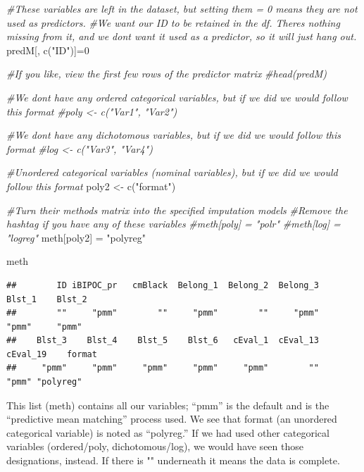 \documentclass[
  english,
]{book}
\newenvironment{Shaded}{\begin{snugshade}}{\end{snugshade}}
\newcommand{\CommentTok}[1]{\textcolor[rgb]{0.56,0.35,0.01}{\textit{#1}}}
\newcommand{\DecValTok}[1]{\textcolor[rgb]{0.00,0.00,0.81}{#1}}
\newcommand{\FunctionTok}[1]{\textcolor[rgb]{0.00,0.00,0.00}{#1}}
\newcommand{\NormalTok}[1]{#1}
\newcommand{\OtherTok}[1]{\textcolor[rgb]{0.56,0.35,0.01}{#1}}
\newcommand{\StringTok}[1]{\textcolor[rgb]{0.31,0.60,0.02}{#1}}
\begin{document}
\begin{Shaded}
\begin{Highlighting}[]
\CommentTok{\#These variables are left in the dataset, but setting them = 0 means they are not used as predictors.  }
\CommentTok{\#We want our ID to be retained in the df.  There\textquotesingle{}s nothing missing from it, and we don\textquotesingle{}t want it used as a predictor, so it will just hang out.}
\NormalTok{predM[, }\FunctionTok{c}\NormalTok{(}\StringTok{"ID"}\NormalTok{)]}\OtherTok{=}\DecValTok{0}

\CommentTok{\#If you like, view the first few rows of the predictor matrix}
\CommentTok{\#head(predM)}

\CommentTok{\#We don\textquotesingle{}t have any ordered categorical variables, but if we did we would follow this format}
\CommentTok{\#poly \textless{}{-} c("Var1", "Var2")}

\CommentTok{\#We don\textquotesingle{}t have any dichotomous variables, but if we did we would follow this format}
\CommentTok{\#log \textless{}{-} c("Var3", "Var4")}

\CommentTok{\#Unordered categorical variables (nominal variables), but if we did we would follow this format}
\NormalTok{poly2 }\OtherTok{\textless{}{-}} \FunctionTok{c}\NormalTok{(}\StringTok{"format"}\NormalTok{)}

\CommentTok{\#Turn their methods matrix into the specified imputation models}
\CommentTok{\#Remove the hashtag if you have any of these variables}
\CommentTok{\#meth[poly] = "polr" }
\CommentTok{\#meth[log] = "logreg"}
\NormalTok{meth[poly2] }\OtherTok{=} \StringTok{"polyreg"}

\NormalTok{meth}
\end{Highlighting}
\end{Shaded}

\begin{verbatim}
##        ID iBIPOC_pr   cmBlack  Belong_1  Belong_2  Belong_3    Blst_1    Blst_2 
##        ""     "pmm"        ""     "pmm"        ""     "pmm"     "pmm"     "pmm" 
##    Blst_3    Blst_4    Blst_5    Blst_6   cEval_1  cEval_13  cEval_19    format 
##     "pmm"     "pmm"     "pmm"     "pmm"     "pmm"        ""     "pmm" "polyreg"
\end{verbatim}

This list (meth) contains all our variables; ``pmm'' is the default and is the ``predictive mean matching'' process used. We see that format (an unordered categorical variable) is noted as ``polyreg.'' If we had used other categorical variables (ordered/poly, dichotomous/log), we would have seen those designations, instead. If there is "" underneath it means the data is complete.
\end{document}
